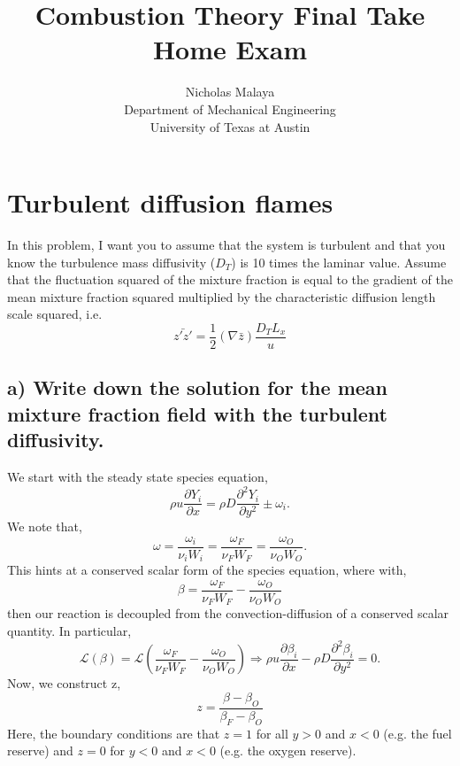 \documentclass{article}
\title{Combustion Theory Final Take Home Exam}
\author{Nicholas Malaya\\ Department of Mechanical Engineering \\
University of Texas at Austin}
\date{}
\begin{document}
\maketitle
\newpage


\section*{Turbulent diffusion flames}

In this problem, I want you to assume that the system is turbulent and
that you know the turbulence mass diffusivity ($D_T$) is 10 times the
laminar value. Assume that the fluctuation squared of the mixture
fraction is equal to the gradient of the mean mixture fraction squared
multiplied by the characteristic diffusion length scale squared, i.e.
\begin{equation}
 \bar{z'z'} = \frac{1}{2} (\nabla \bar z) \frac{D_T L_x}{u}
\end{equation}

\subsection*{a) Write down the solution for the mean mixture fraction field
  with the turbulent diffusivity.}

We start with the steady state species equation, 
\begin{equation}
 \rho u \frac{\partial Y_i}{\partial x} = \rho D \frac{\partial^2
  Y_i}{\partial y^2} \pm \omega_i. 
\end{equation}
We note that, 
\begin{equation}
 \omega = \frac{\omega_i}{\nu_i W_i} = \frac{\omega_F}{\nu_F W_F} =
  \frac{\omega_O}{\nu_O W_O}. 
\end{equation}
This hints at a conserved scalar form of the species equation, where
with, 
\begin{equation}
 \beta  = \frac{\omega_F}{\nu_F W_F} - \frac{\omega_O}{\nu_O W_O}
\end{equation}
then our reaction is decoupled from the convection-diffusion of a
conserved scalar quantity. In particular, 
\begin{equation}
 \mathcal{L}(\beta)  = \mathcal{L}\left(\frac{\omega_F}{\nu_F W_F} -
				   \frac{\omega_O}{\nu_O W_O} \right)
 \Rightarrow \rho u \frac{\partial \beta_i}{\partial x} - \rho D \frac{\partial^2
  \beta_i}{\partial y^2} = 0. 
\end{equation}
Now, we construct z, 
\begin{equation}
 z = \frac{\beta -\beta_{O}}{\beta_F - \beta_{O}}
\end{equation}
Here, the boundary conditions are that $z=1$ for all $y>0$ and $x<0$
(e.g. the fuel reserve) and $z=0$ for $y<0$ and $x<0$ (e.g. the oxygen
reserve). 
\end{document}
